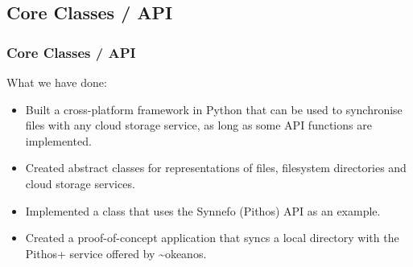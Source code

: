 \documentclass{beamer}
\begin{document}
	\subsection{Core Classes / API}
  \begin{tframe} \frametitle{Core Classes / API}
    What we have done:
    \begin{itemize}
      \item Built a cross-platform framework in Python that can be used to synchronise files with any cloud storage service, as long as some API functions are implemented.
      \item Created abstract classes for representations of files, filesystem directories and cloud storage services.
      \item Implemented a class that uses the Synnefo (Pithos) API as an example.
      \item Created a proof-of-concept application that syncs a local directory with the Pithos+ service offered by \textasciitilde okeanos.
    \end{itemize}
  \end{tframe}
\end{document}
